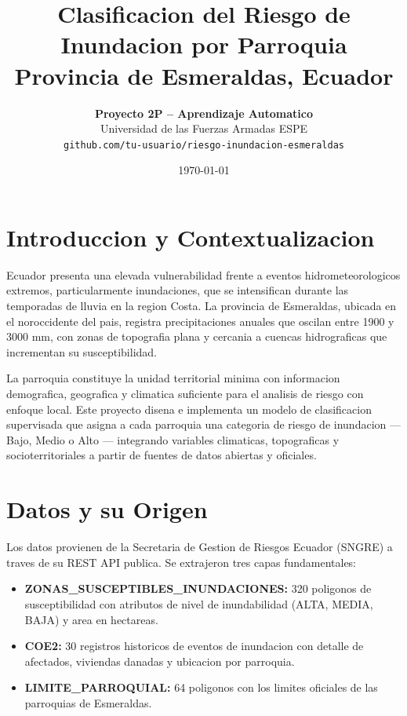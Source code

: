 \documentclass[12pt,a4paper]{article}
\title{\vspace{-1.5cm}
    \textbf{Clasificacion del Riesgo de Inundacion por Parroquia}\\
    \large Provincia de Esmeraldas, Ecuador
}
\author{
    \textbf{Proyecto 2P -- Aprendizaje Automatico} \\
    Universidad de las Fuerzas Armadas ESPE \\
    \texttt{github.com/tu-usuario/riesgo-inundacion-esmeraldas}
}
\date{\today}
\begin{document}
\maketitle
\thispagestyle{empty}

\section{Introduccion y Contextualizacion}

Ecuador presenta una elevada vulnerabilidad frente a eventos hidrometeorologicos extremos, particularmente inundaciones, que se intensifican durante las temporadas de lluvia en la region Costa. La provincia de Esmeraldas, ubicada en el noroccidente del pais, registra precipitaciones anuales que oscilan entre 1900 y 3000 mm, con zonas de topografia plana y cercania a cuencas hidrograficas que incrementan su susceptibilidad.

La parroquia constituye la unidad territorial minima con informacion demografica, geografica y climatica suficiente para el analisis de riesgo con enfoque local. Este proyecto disena e implementa un modelo de clasificacion supervisada que asigna a cada parroquia una categoria de riesgo de inundacion --- Bajo, Medio o Alto --- integrando variables climaticas, topograficas y socioterritoriales a partir de fuentes de datos abiertas y oficiales.

\section{Datos y su Origen}

Los datos provienen de la Secretaria de Gestion de Riesgos Ecuador (SNGRE) a traves de su REST API publica. Se extrajeron tres capas fundamentales:

\begin{itemize}
    \item \textbf{ZONAS\_SUSCEPTIBLES\_INUNDACIONES:} 320 poligonos de susceptibilidad con atributos de nivel de inundabilidad (ALTA, MEDIA, BAJA) y area en hectareas.
    \item \textbf{COE2:} 30 registros historicos de eventos de inundacion con detalle de afectados, viviendas danadas y ubicacion por parroquia.
    \item \textbf{LIMITE\_PARROQUIAL:} 64 poligonos con los limites oficiales de las parroquias de Esmeraldas.
\end{itemize}
\end{document}
